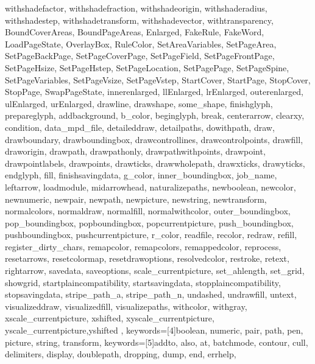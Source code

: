{{        withshadefactor, withshadefraction, withshadeorigin,%
        withshaderadius, withshadestep, withshadetransform,%
        withshadevector, withtransparency,%
        BoundCoverAreas, BoundPageAreas, Enlarged, FakeRule,%
        FakeWord, LoadPageState, OverlayBox, RuleColor,%
        SetAreaVariables, SetPageArea, SetPageBackPage,%
        SetPageCoverPage, SetPageField, SetPageFrontPage,%
        SetPageHsize, SetPageHstep, SetPageLocation,%
        SetPagePage, SetPageSpine, SetPageVariables,%
        SetPageVsize, SetPageVstep, StartCover, StartPage,%
        StopCover, StopPage, SwapPageState, innerenlarged,%
        llEnlarged, lrEnlarged, outerenlarged, ulEnlarged, urEnlarged,%
        drawline, drawshape, some_shape,%
        finishglyph, prepareglyph,%
        addbackground, b_color, beginglyph, break, centerarrow,%
        clearxy, condition, data_mpd_file, detaileddraw,%
        detailpaths, dowithpath, draw, drawboundary,%
        drawboundingbox, drawcontrollines, drawcontrolpoints,%
        drawfill, draworigin, drawpath, drawpathonly,%
        drawpathwithpoints, drawpoint, drawpointlabels,%
        drawpoints, drawticks, drawwholepath, drawxticks,%
        drawyticks, endglyph, fill, finishsavingdata, g_color,%
        inner_boundingbox, job_name, leftarrow, loadmodule,%
        midarrowhead, naturalizepaths, newboolean, newcolor,%
        newnumeric, newpair, newpath, newpicture, newstring,%
        newtransform, normalcolors, normaldraw, normalfill,%
        normalwithcolor, outer_boundingbox, pop_boundingbox,%
        popboundingbox, popcurrentpicture, push_boundingbox,%
        pushboundingbox, pushcurrentpicture, r_color, readfile,%
        recolor, redraw, refill, register_dirty_chars,%
        remapcolor, remapcolors, remappedcolor, reprocess,%
        resetarrows, resetcolormap, resetdrawoptions,%
        resolvedcolor, restroke, retext, rightarrow, savedata,%
        saveoptions, scale_currentpicture, set_ahlength,%
        set_grid, showgrid, startplaincompatibility,%
        startsavingdata, stopplaincompatibility,%
        stopsavingdata, stripe_path_a, stripe_path_n, undashed,%
        undrawfill, untext, visualizeddraw, visualizedfill,%
        visualizepaths, withcolor, withgray,%
        xscale_currentpicture, xshifted,%
        xyscale_currentpicture, yscale_currentpicture,yshifted%
    },%
    keywords=[4]{boolean, numeric, pair, path, pen, picture, string, transform},%
    keywords=[5]{addto, also, at, batchmode, contour, cull, delimiters,%
        display, doublepath, dropping, dump, end, errhelp,%
}}
